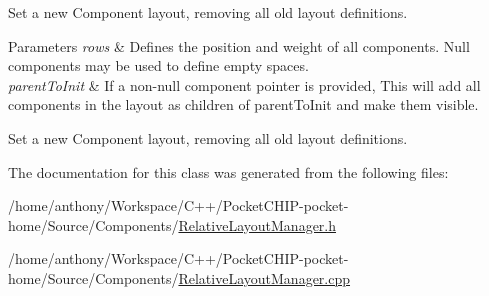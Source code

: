 Set a new Component layout, removing all old layout definitions.


\begin{DoxyParams}{Parameters}
{\em rows} & Defines the position and weight of all components. Null components may be used to define empty spaces.\\
\hline
{\em parent\+To\+Init} & If a non-\/null component pointer is provided, This will add all components in the layout as children of parent\+To\+Init and make them visible.\\
\hline
\end{DoxyParams}
Set a new Component layout, removing all old layout definitions. 

The documentation for this class was generated from the following files\+:\begin{DoxyCompactItemize}
\item 
/home/anthony/\+Workspace/\+C++/\+Pocket\+C\+H\+I\+P-\/pocket-\/home/\+Source/\+Components/\mbox{\hyperlink{RelativeLayoutManager_8h}{Relative\+Layout\+Manager.\+h}}\item 
/home/anthony/\+Workspace/\+C++/\+Pocket\+C\+H\+I\+P-\/pocket-\/home/\+Source/\+Components/\mbox{\hyperlink{RelativeLayoutManager_8cpp}{Relative\+Layout\+Manager.\+cpp}}\end{DoxyCompactItemize}

